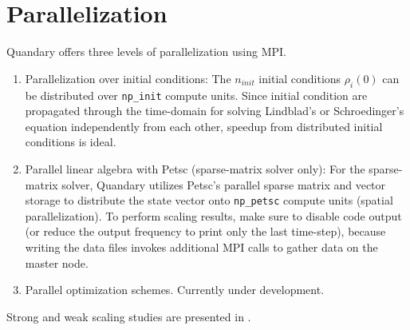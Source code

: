 \documentclass[11pt]{article}
\begin{document}
    \section{Parallelization}
    Quandary offers three levels of parallelization using MPI. 
    \begin{enumerate}
    \item Parallelization over initial conditions: The $n_{init}$ initial conditions $\rho_i(0)$ can be distributed over \texttt{np\_init} compute units. Since initial condition are propagated through the time-domain for solving Lindblad's or Schroedinger's equation independently from each other, speedup from distributed initial conditions is ideal. 
    \item Parallel linear algebra with Petsc (sparse-matrix solver only): For the sparse-matrix solver, Quandary utilizes Petsc's parallel sparse matrix and vector storage to distribute the state vector onto \texttt{np\_petsc} compute units (spatial parallelization). To perform scaling results, make sure to disable code output (or reduce the output frequency to print only the last time-step), because writing the data files invokes additional MPI calls to gather data on the master node.
    \item Parallel optimization schemes. Currently under development.      
    \end{enumerate}
    Strong and weak scaling studies are presented in \cite{guenther2021quantum}.
\end{document}
